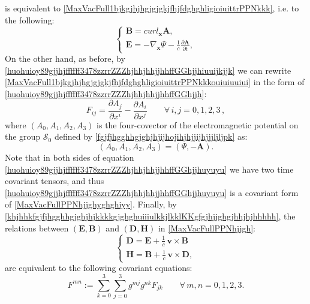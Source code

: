\documentclass{article}
\theoremstyle{definition}
\theoremstyle{remark}
\renewcommand{\vec}[1]{\mathbf{#1}}
\newcommand{\er}{\eqref}
\newcommand{\er}{\eqref}
\begin{document}
is equivalent to
\er{MaxVacFull1bjkgjhjhgjgjgkjfhjfdghghligioiuittrPPNkkk}, i.e. to
the following:
\begin{equation}\label{MaxVacFull1bjkgjhjhgjgjgkjfhjfdghghligioiuittrPPNkkkouiuiuuiui}
\begin{cases}
\vec B= curl_{\vec x} \vec A,\\
\vec E=-\nabla_{\vec x}\Psi-\frac{1}{c}\frac{\partial\vec
A}{\partial t},
\end{cases}
\end{equation}
On the other hand, as before, by
\er{huohuioy89gjjhjffffff3478zzrrZZZhjhhjhhjjhhffGGhjjhiuuijkjjk} we
can rewrite
\er{MaxVacFull1bjkgjhjhgjgjgkjfhjfdghghligioiuittrPPNkkkouiuiuuiui}
in the form of
\er{huohuioy89gjjhjffffff3478zzrrZZZhjhhjhhjjhhffGGhjjh}:
\begin{equation}\label{huohuioy89gjjhjffffff3478zzrrZZZhjhhjhhjjhhffGGhjjhuyuyu}
F_{ij}=\frac{\partial A_j}{\partial x^i}-\frac{\partial
A_i}{\partial x^j}\quad\quad\forall\, i,j=0,1,2,3\,,
\end{equation}
where $(A_0,A_1,A_2,A_3)$ is the four-covector of the
electromagnetic potential on the group $\mathcal{S}_0$ defined by
\er{fgjfjhgghhgjghjhjijhojihjhjjijhjjjljljpk} as:
\begin{equation}\label{fgjfjhgghhgjghjhjijhojihjhjjijhjjjljljpkyuuyyu}
(A_0,A_1,A_2,A_3)=(\Psi,-\vec A).
\end{equation}
Note that in both sides of equation
\er{huohuioy89gjjhjffffff3478zzrrZZZhjhhjhhjjhhffGGhjjhuyuyu} we
have two time covariant tensors, and thus
\er{huohuioy89gjjhjffffff3478zzrrZZZhjhhjhhjjhhffGGhjjhuyuyu} is a
covariant form of \er{MaxVacFullPPNhjjghyghghiyy}. Finally, by
\er{khjhhkfgjfjhgghhgjghjhjkkkkgjghghuiiiulkkjlkklKKgfgjhjjghgjhhjhjhhhhh},
the relations between $(\vec E,\vec B)$ and $(\vec D,\vec H)$ in
\er{MaxVacFullPPNhjjgh}:
\begin{equation}\label{MaxVacFullPPNhjjghojjkjkiou}
\begin{cases}
\vec D=\vec E+\frac{1}{c}\,\vec v\times
\vec B\\
\vec H=\vec B+\frac{1}{c}\,\vec v\times \vec D,
\end{cases}
\end{equation}
are equivalent to the following covariant equations:
\begin{equation}\label{fgjfjhgghhgjghjhjkkkkgjghghuiiiulkkjlkklKKkjkj}
F^{mn}:=\sum_{k=0}^{3}\sum_{j=0}^{3}g^{mj}g^{nk}F_{jk}
\quad\quad\forall\, m,n=0,1,2,3.
\end{equation}
\end{document}
